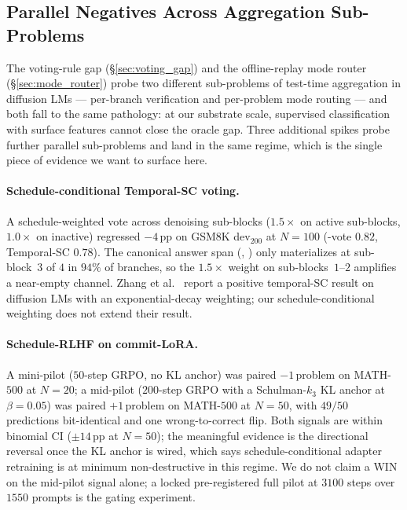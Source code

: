 \subsection{Parallel Negatives Across Aggregation Sub-Problems}
\label{subsec:parallel_negatives}

The voting-rule gap (\S\ref{sec:voting_gap}) and the offline-replay
mode router (\S\ref{sec:mode_router}) probe two different
sub-problems of test-time aggregation in diffusion LMs --- per-branch
verification and per-problem mode routing --- and both fall to the
same pathology: at our substrate scale, supervised classification
with surface features cannot close the oracle gap.  Three
additional spikes probe further parallel sub-problems and land in
the same regime, which is the single piece of evidence we want to
surface here.

\paragraph{Schedule-conditional Temporal-SC voting.}
A schedule-weighted vote across denoising sub-blocks
($1.5\times$ on active sub-blocks, $1.0\times$ on inactive)
regressed $-4$\,pp on GSM8K dev$_{200}$ at $N{=}100$
(\cmajc{}-vote $0.82$, Temporal-SC $0.78$).  The
canonical answer span (\code{\#\#\#\#}, ) only
materializes at sub-block~$3$ of $4$ in $94\%$ of branches, so the
$1.5\times$ weight on sub-blocks~$1$--$2$ amplifies a near-empty
channel.  Zhang et al.~\citep{zhang2025timefeature} report a
positive temporal-SC result on diffusion LMs with an
exponential-decay weighting; our schedule-conditional weighting
does not extend their result.

\paragraph{Schedule-RLHF on commit-LoRA.}
A mini-pilot ($50$-step GRPO, no KL anchor) was paired
$-1$\,problem on MATH-$500$ at $N{=}20$; a mid-pilot ($200$-step
GRPO with a Schulman-$k_3$ KL anchor at $\beta{=}0.05$) was paired
$+1$\,problem on MATH-$500$ at $N{=}50$, with $49/50$ predictions
bit-identical and one wrong-to-correct flip.  Both signals are
within binomial CI ($\pm 14$\,pp at $N{=}50$); the meaningful
evidence is the directional reversal once the KL anchor is wired,
which says schedule-conditional adapter retraining is at minimum
non-destructive in this regime.  We do not claim a WIN on the
mid-pilot signal alone; a locked pre-registered full pilot at
$3100$ steps over $1550$ prompts is the gating experiment.

